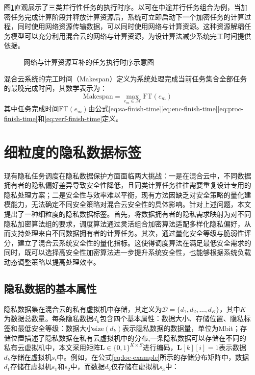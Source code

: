 图\ref{fig:task-start-time}直观展示了三类并行性任务的执行时序。以可在中途并行任务组合为例，当加密任务完成计算阶段并释放计算资源后，系统可立即启动下一个加密任务的计算过程，同时使用网络资源传输数据，可以同时使用网络与计算资源。这种资源解耦任务模型可以充分利用混合云的网络与计算资源，为设计算法减少系统完工时间提供依据。

\begin{figure}[htb]
    
    \caption{网络与计算资源互补的任务执行时序示意图}\label{fig:task-start-time}
\end{figure}

混合云系统的完工时间（Makespan）定义为系统处理完成当前任务集合全部任务的最晚完成时间，其数学表示为：
\begin{equation}
    \text{Makespan} = \max_{e_m \in \mathcal{M}} \text{FT}(e_m)
    \label{eq:makespan}
\end{equation}
其中任务完成时间\(\text{FT}(e_m)\)由公式\eqref{eq:sa-finish-time}\eqref{eq:enc-finish-time}\eqref{eq:proc-finish-time}和\eqref{eq:verf-finish-time}定义。

\section{细粒度的隐私数据标签}\label{sec:privacy-system}

现有隐私任务调度在隐私数据保护方面面临两大挑战：一是在混合云中，不同数据拥有者的隐私偏好差异导致安全性降低，且同类计算任务往往需要重复设计专用的隐私处理方案；二是安全性与效率难以平衡，现有方法因缺乏对安全策略的量化建模能力，无法确定不同安全策略对混合云安全性的具体影响。针对上述问题，本文提出了一种细粒度的隐私数据标签。首先，将数据拥有者的隐私需求映射为对不同隐私加密算法组的要求，调度算法通过灵活组合加密算法适配多样化隐私偏好，从而支持处理来自不同数据拥有者的计算任务。其次，通过量化安全等级与脆弱性评分，建立了混合云系统安全性的量化指标。这使得调度算法在满足最低安全需求的同时，既可以选择高安全性加密算法进一步提升系统安全性，也能够根据系统负载动态调整策略以提高处理效率。

\subsection{隐私数据的基本属性}\label{subsec:data-formulation}

隐私数据集在混合云的私有虚拟机中存储，其定义为$\mathcal{D} = \{d_1, d_2, \dots, d_K\}$，其中$K$为数据总数量。每条隐私数据$d_k$包含四个基本属性：数据大小、存储位置、隐私标签和最低安全等级：数据大小$\text{size}(d_k)$表示隐私数据的数据量，单位为Mbit；存储位置描述了隐私数据在私有云虚拟机中的分布,一条隐私数据可以存储在不同的私有云虚拟机中，本文采用矩阵$\mathbf{L} \in \{0,1\}^{K \times S}$进行编码，$\mathbf{L}[k][i] = 1$表示数据$d_k$存储在虚拟机$s_i$中。例如，在公式\eqref{eq:loc-example}所示的存储分布矩阵中，数据$d_1$存储在虚拟机$s_1$和$s_2$中，而数据$d_2$仅存储在虚拟机$s_3$中：


